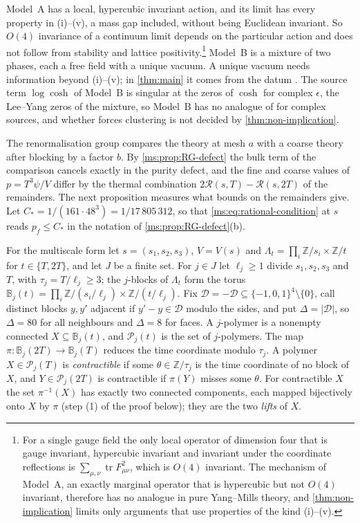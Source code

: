 \documentclass[11pt,a4paper]{amsart}
\theoremstyle{definition}
\theoremstyle{remark}
\numberwithin{equation}{section}
\DeclareMathOperator{\tr}{tr}        %
\newcommand{\Z}{\mathbb{Z}}          %
\newcommand{\abs}[1]{\lvert #1\rvert}      %
\newcommand{\Vol}[1]{V(#1)}                %
\newcommand{\Mcirc}{\text{\upshape(M$^{\circ}$)}}   %
\newcommand{\San}{\text{\upshape(S$'_{\mathrm{an}}$)}} %
\begin{document}
Model~A has a local, hypercubic invariant action, and its limit has every property in (i)--(v), a mass gap included, without being Euclidean invariant. So $O(4)$ invariance of a continuum limit depends on the particular action and does not follow from stability and lattice positivity.\footnote{For a single gauge field the only local operator of dimension four that is gauge invariant, hypercubic invariant and invariant under the coordinate reflections is $\sum_{\mu,\nu}\tr F_{\mu\nu}^2$, which is $O(4)$ invariant. The mechanism of Model~A, an exactly marginal operator that is hypercubic but not $O(4)$ invariant, therefore has no analogue in pure Yang--Mills theory, and \cref{thm:non-implication} limits only arguments that use properties of the kind (i)--(v).} Model~B is a mixture of two phases, each a free field with a unique vacuum. A unique vacuum needs information beyond (i)--(v); in \cref{thm:main} it comes from the datum \Mcirc. The source term $\log\cosh$ of Model~B is singular at the zeros of $\cosh$ for complex $\epsilon$, the Lee--Yang zeros of the mixture, so Model~B has no analogue of \San{} for complex sources, and whether \San{} forces clustering is not decided by \cref{thm:non-implication}.

The renormalisation group compares the theory at mesh $a$ with a coarse theory after blocking by a factor $b$. By \cref{ms:prop:RG-defect} the bulk term of the comparison cancels exactly in the purity defect, and the fine and coarse values of $p=T^3\psi/V$ differ by the thermal combination $2\mathcal R(s,T)-\mathcal R(s,2T)$ of the remainders. The next proposition measures what bounds on the remainders give. Let $C_*=1/(161\cdot48^3)=1/17\,805\,312$, so that \eqref{ms:eq:rational-condition} at $s$ reads $p_f\le C_*$ in the notation of \cref{ms:prop:RG-defect}(b).

For the multiscale form let $s=(s_1,s_2,s_3)$, $V=\Vol s$ and $\Lambda_t=\prod_i\Z/s_i\times\Z/t$ for $t\in\{T,2T\}$, and let $J$ be a finite set. For $j\in J$ let $\ell_j\ge1$ divide $s_1,s_2,s_3$ and $T$, with $\tau_j=T/\ell_j\ge3$; the $j$-blocks of $\Lambda_t$ form the torus $\mathbb B_j(t)=\prod_i\Z/(s_i/\ell_j)\times\Z/(t/\ell_j)$. Fix $\mathcal D=-\mathcal D\subseteq\{-1,0,1\}^4\setminus\{0\}$, call distinct blocks $y,y'$ adjacent if $y'-y\in\mathcal D$ modulo the sides, and put $\Delta=\abs{\mathcal D}$, so $\Delta=80$ for all neighbours and $\Delta=8$ for faces. A $j$-polymer is a nonempty connected $X\subseteq\mathbb B_j(t)$, and $\mathcal P_j(t)$ is the set of $j$-polymers. The map $\pi\colon\mathbb B_j(2T)\to\mathbb B_j(T)$ reduces the time coordinate modulo $\tau_j$. A polymer $X\in\mathcal P_j(T)$ is \emph{contractible} if some $\theta\in\Z/\tau_j$ is the time coordinate of no block of $X$, and $Y\in\mathcal P_j(2T)$ is contractible if $\pi(Y)$ misses some $\theta$. For contractible $X$ the set $\pi^{-1}(X)$ has exactly two connected components, each mapped bijectively onto $X$ by $\pi$ (step (1) of the proof below); they are the two \emph{lifts} of $X$.
\end{document}
